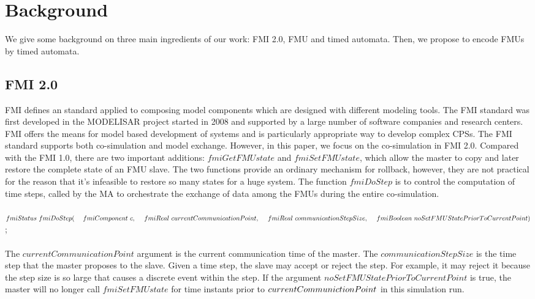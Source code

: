 
\section{Background}
\label{sec:fmi}
We give some background on three main ingredients of our work: FMI 2.0, FMU and timed automata. Then, we propose to encode FMUs by timed automata.
\subsection{FMI 2.0}
FMI \cite{BromanBGLMTW13} defines an standard applied to composing model components which are designed with different modeling tools. The FMI standard was first developed in the MODELISAR project started in 2008 and supported by a large number of software companies and research centers. FMI offers the means for model based development of systems and is particularly appropriate way to develop complex CPSs. The FMI standard supports both co-simulation and  model exchange. However, in this paper, we focus on the co-simulation in FMI 2.0.
Compared with the FMI 1.0, there are two important additions: $fmiGetFMUstate$ and $fmiSetFMUstate$, which allow the master to copy and later restore the complete state of an FMU slave. The two functions provide an ordinary mechanism for rollback, however, they are not practical for the reason that it's infeasible to restore so many states for a huge system. The function $fmiDoStep$ is to control the computation of time steps, called by the MA to orchestrate the exchange of data among the FMUs during the entire co-simulation. 
\\
\\
$fmiStatus~fmiDoStep(
\\
~~~~fmiComponent~c,
\\
~~~~fmiReal~currentCommunicationPoint,
\\
~~~~fmiReal~communicationStepSize,
\\
~~~~fmiBoolean~noSetFMUStatePriorToCurrentPoint)$;
\\
\\
The $currentCommunicationPoint$ argument is the current communication time of the master. The $communicationStepSize$ is the time step that the master proposes to the slave. Given a time step, the slave may accept or reject the step. For example, it may reject it because the step size is so large that causes a discrete event within the step. If the argument $noSetFMUStatePriorToCurrentPoint$ is true, the master will no longer call $fmiSetFMUstate$ for time instants prior to $currentCommunic \\ tionPoint$ in this simulation run. 
